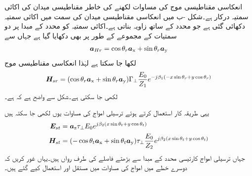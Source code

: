 انعکاسی مقناطیسی موج کی مساوات لکھنے کی خاطر مقناطیسی میدان کی اکائی سمتیہ درکار ہے۔شکل -ب میں انعکاسی مقناطیسی میدان کی سمت میں اکائی سمتیہ  دکھائی گئی ہے جو  محدد کے ساتھ  زاویہ بناتی ہے۔اکائی سمتیہ کو محدد کے مبدا پر دو سمتیات کے مجموعے کے طور پر بھی دکھایا گیا ہے جہاں سے
\begin{align}
{\ensuremath{{\boldsymbol{a}}}}_{Hr}=\cos \theta_r {\boldsymbol{a}}_{\textup{x}}+\sin \theta_r {\boldsymbol{a}}_{\textup{y}}
\end{align}
لکھا جا سکتا ہے لہٰذا انعکاسی مقناطیسی موج
\begin{align} \label{مساوات_ترچھی_انعکاسی_مقناطیسی_میدان_دوری_سمتی}
{\ensuremath{{\boldsymbol{H}}}}_{sr}=(\cos \theta_r {\boldsymbol{a}}_{\textup{x}}+\sin \theta_r {\boldsymbol{a}}_{\textup{y}})\Gamma_{\perp} \frac{ E_0}{Z_1} e^{-j \beta_1 (-x \sin \theta_r+y\cos \theta_r)}
\end{align}
لکھی جا سکتی ہے۔شکل سے واضح ہے کہ  ہے۔

یہی طریقہ کار استعمال  کرتے ہوئے ترسیلی امواج کی مساوات یوں لکھی جا سکتہ ہیں
\begin{align}
{\ensuremath{{\boldsymbol{E}}}}_{st} &={\boldsymbol{a}}_{\textup{z}} \tau_{\perp} E_0 e^{j \beta_2 (x \sin \theta_t+y\cos \theta_t)}  \label{مساوات_ترچھی_انحرافی_برقی_میدان_دوری_سمتی}\\
{{\boldsymbol{H}}}_{st} &=(-\cos \theta_t {\boldsymbol{a}}_{\textup{x}}+\sin \theta_t {\boldsymbol{a}}_{\textup{y}} ) \tau_{\perp} \frac{E_0}{Z_2} e^{j \beta_2 (x \sin \theta_t+y\cos \theta_t)}  \label{مساوات_ترچھی_انحرافی_مقناطیسی_میدان_دوری_سمتی}
\end{align}
جہاں ترسیلی امواج کارتیسی محدد کے مبدا سے بڑھتے فاصلے کی طرف رواں ہیں۔یہاں غور کریں کہ دوسرے خطے میں امواج کی مساوات میں مستقل  اور  استعمال کیے گئے ہیں۔


